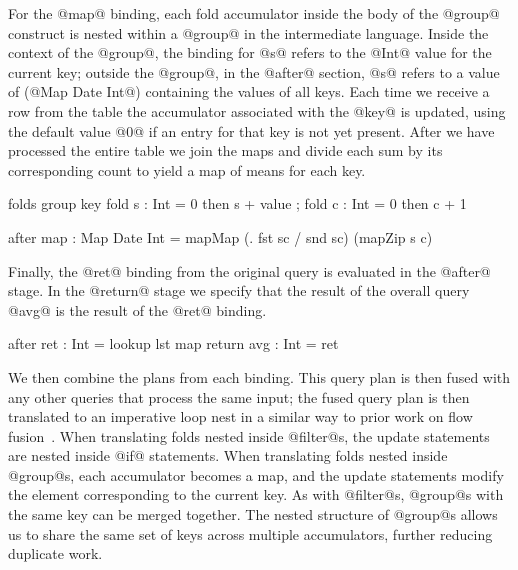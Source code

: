 For the @map@ binding, each fold accumulator inside the body of the @group@ construct is nested within a @group@ in the intermediate language.
Inside the context of the @group@, the binding for @s@ refers to the @Int@ value for the current key; outside the @group@, in the @after@ section, @s@ refers to a value of (@Map Date Int@) containing the values of all keys.
Each time we receive a row from the table the accumulator associated with the @key@ is updated, using the default value @0@ if an entry for that key is not yet present.
After we have processed the entire table we join the maps and divide each sum by its corresponding count to yield a map of means for each key.
\begin{icicle-core}
folds  { group key
          { fold s : Int = 0 then s + value
          ; fold c : Int = 0 then c + 1 } }

after  { map : Map Date Int
          = mapMap (\sc. fst sc / snd sc) (mapZip s c) }
\end{icicle-core}


Finally, the @ret@ binding from the original query is evaluated in the @after@ stage. In the @return@ stage we specify that the result of the overall query @avg@ is the result of the @ret@ binding.
\begin{icicle-core}
  after  { ret : Int = lookup lst map }
  return { avg : Int = ret }
\end{icicle-core}


We then combine the plans from each binding.
This query plan is then fused with any other queries that process the same input; the fused query plan is then translated to an imperative loop nest in a similar way to prior work on flow fusion~\cite{lippmeier2013data}.
When translating folds nested inside @filter@s, the update statements are nested inside @if@ statements.
When translating folds nested inside @group@s, each accumulator becomes a map, and the update statements modify the element corresponding to the current key.
As with @filter@s, @group@s with the same key can be merged together.
The nested structure of @group@s allows us to share the same set of keys across multiple accumulators, further reducing duplicate work.

